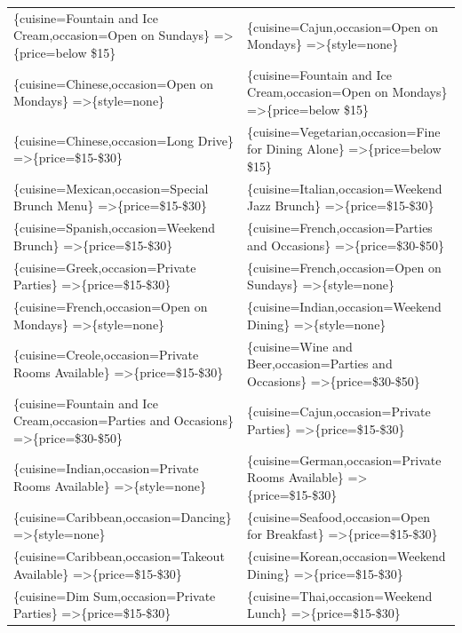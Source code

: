 \documentclass[letterpaper,10pt]{article}
\begin{document}
\begin{appendices}
\begin{table}[h]
\begin{adjustbox}{max width=\textwidth}
\begin{tabular}{ll}
\{cuisine=Fountain and Ice Cream,occasion=Open on Sundays\} =\textgreater \{price=below \$15\} & \{cuisine=Cajun,occasion=Open on Mondays\} =\textgreater \{style=none\} \\ 
\{cuisine=Chinese,occasion=Open on Mondays\} =\textgreater \{style=none\} & \{cuisine=Fountain and Ice Cream,occasion=Open on Mondays\} =\textgreater \{price=below \$15\} \\ 
\{cuisine=Chinese,occasion=Long Drive\} =\textgreater \{price=\$15-\$30\} & \{cuisine=Vegetarian,occasion=Fine for Dining Alone\} =\textgreater \{price=below \$15\} \\ 
\{cuisine=Mexican,occasion=Special Brunch Menu\} =\textgreater \{price=\$15-\$30\} & \{cuisine=Italian,occasion=Weekend Jazz Brunch\} =\textgreater \{price=\$15-\$30\} \\ 
\{cuisine=Spanish,occasion=Weekend Brunch\} =\textgreater \{price=\$15-\$30\} & \{cuisine=French,occasion=Parties and Occasions\} =\textgreater \{price=\$30-\$50\} \\ 
\{cuisine=Greek,occasion=Private Parties\} =\textgreater \{price=\$15-\$30\} & \{cuisine=French,occasion=Open on Sundays\} =\textgreater \{style=none\} \\ 
\{cuisine=French,occasion=Open on Mondays\} =\textgreater \{style=none\} & \{cuisine=Indian,occasion=Weekend Dining\} =\textgreater \{style=none\} \\ 
\{cuisine=Creole,occasion=Private Rooms Available\} =\textgreater \{price=\$15-\$30\} & \{cuisine=Wine and Beer,occasion=Parties and Occasions\} =\textgreater \{price=\$30-\$50\} \\ 
\{cuisine=Fountain and Ice Cream,occasion=Parties and Occasions\} =\textgreater \{price=\$30-\$50\} & \{cuisine=Cajun,occasion=Private Parties\} =\textgreater \{price=\$15-\$30\} \\ 
\{cuisine=Indian,occasion=Private Rooms Available\} =\textgreater \{style=none\} & \{cuisine=German,occasion=Private Rooms Available\} =\textgreater \{price=\$15-\$30\} \\ 
\{cuisine=Caribbean,occasion=Dancing\} =\textgreater \{style=none\} & \{cuisine=Seafood,occasion=Open for Breakfast\} =\textgreater \{price=\$15-\$30\} \\ 
\{cuisine=Caribbean,occasion=Takeout Available\} =\textgreater \{price=\$15-\$30\} & \{cuisine=Korean,occasion=Weekend Dining\} =\textgreater \{price=\$15-\$30\} \\ 
\{cuisine=Dim Sum,occasion=Private Parties\} =\textgreater \{price=\$15-\$30\} & \{cuisine=Thai,occasion=Weekend Lunch\} =\textgreater \{price=\$15-\$30\} \\ 

\end{tabular}
\end{adjustbox}
\end{table}
\end{appendices}
\end{document}
